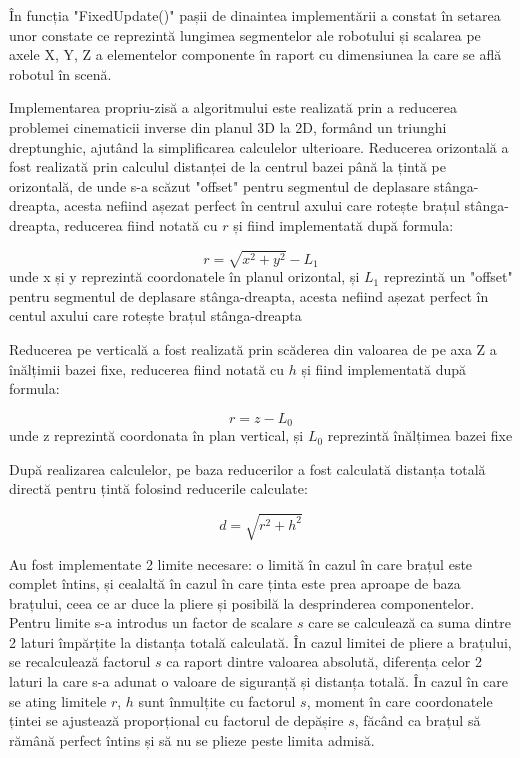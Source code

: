 În funcția "FixedUpdate()" pașii de dinaintea implementării a constat în setarea unor constate ce reprezintă lungimea segmentelor ale robotului și scalarea pe axele X, Y, Z a elementelor componente în raport cu dimensiunea la care se află robotul în scenă. 

Implementarea propriu-zisă a algoritmului este realizată prin a reducerea problemei cinematicii inverse din planul 3D la 2D, formând un triunghi dreptunghic, ajutând la simplificarea calculelor ulterioare. Reducerea orizontală a fost realizată prin calculul distanței de la centrul bazei până la țintă pe orizontală, de unde s-a scăzut "offset" pentru segmentul de deplasare stânga-dreapta, acesta nefiind așezat perfect în centrul axului care rotește brațul stânga-dreapta, reducerea fiind notată cu $r$ și fiind implementată după formula:


	\begin{equation}
	r = \sqrt{x^2 + y^2} - L_1
	\end{equation}
	unde x și y reprezintă coordonatele în planul orizontal, și $L_1$ reprezintă un "offset" pentru segmentul de deplasare stânga-dreapta, acesta nefiind așezat perfect în centul axului care rotește brațul stânga-dreapta



Reducerea pe verticală a fost realizată prin scăderea din valoarea de pe axa Z a  înălțimii bazei fixe, reducerea fiind notată cu $h$ și fiind implementată după formula:

	\begin{equation}
	r = z - L_0
\end{equation}
unde z reprezintă coordonata în plan vertical, și $L_0$ reprezintă înălțimea bazei fixe



După realizarea calculelor, pe baza reducerilor a fost calculată distanța totală directă pentru țintă folosind reducerile calculate:

	\begin{equation}
	d = \sqrt{r^2 + h^2}
\end{equation}

Au fost implementate 2 limite necesare: o limită în cazul în care brațul este complet întins, și cealaltă în cazul în care ținta este prea aproape de baza brațului, ceea ce ar duce la pliere și posibilă la desprinderea componentelor. 
Pentru limite s-a introdus un factor de scalare $s$ care se calculează ca suma dintre 2 laturi împărțite la distanța totală calculată.
În cazul limitei de pliere a brațului, se recalculează factorul $s$ ca raport dintre valoarea absolută, diferența celor 2 laturi la care s-a adunat o valoare de siguranță și distanța totală. 
În cazul în care se ating limitele $r$, $h$ sunt înmulțite cu factorul $s$, moment în care coordonatele țintei se ajustează proporțional cu factorul de depășire $s$, făcând ca brațul să rămână perfect întins și să nu se plieze peste limita admisă. 


